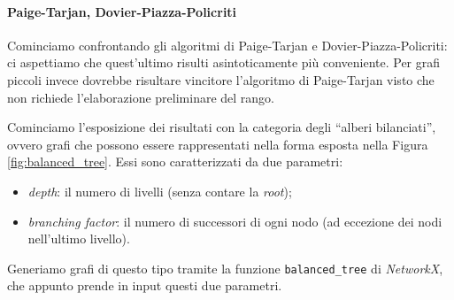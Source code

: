 \paragraph{Paige-Tarjan, Dovier-Piazza-Policriti} Cominciamo confrontando gli algoritmi di Paige-Tarjan e Dovier-Piazza-Policriti: ci aspettiamo che quest'ultimo risulti asintoticamente più conveniente. Per grafi piccoli invece dovrebbe risultare vincitore l'algoritmo di Paige-Tarjan visto che non richiede l'elaborazione preliminare del rango.

Cominciamo l'esposizione dei risultati con la categoria degli ``alberi bilanciati'', ovvero grafi che possono essere rappresentati nella forma esposta nella Figura \ref{fig:balanced_tree}. Essi sono caratterizzati da due parametri:
\begin{itemize}
    \item \emph{depth}: il numero di livelli (senza contare la \emph{root});
    \item \emph{branching factor}: il numero di successori di ogni nodo (ad eccezione dei nodi nell'ultimo livello).
\end{itemize}

\noindent Generiamo grafi di questo tipo tramite la funzione \verb|balanced_tree| di \emph{NetworkX}, che appunto prende in input questi due parametri.

